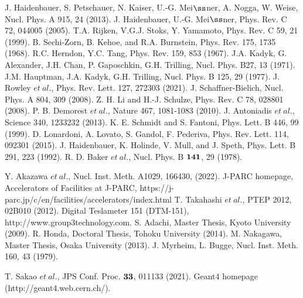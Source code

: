 \begin{thebibliography}{99}
J. Haidenbauer, S. Petschauer, N. Kaiser, U.-G. Mei$\ss$ner, A. Nogga, W. Weise, Nucl. Phys. A 915, 24 (2013).
J. Haidenbauer, U.-G. Mei$\ss$ner, Phys. Rev. C 72, 044005 (2005).
T.A. Rijken, V.G.J. Stoks, Y. Yamamoto, Phys. Rev. C 59, 21 (1999).
B. Sechi-Zorn, B. Kehoe, and R.A. Burnstein, Phys. Rev. 175, 1735 (1968).
R.C. Herndon, Y.C. Tang, Phys. Rev. 159, 853 (1967).
J.A. Kadyk, G. Alexander, J.H. Chan, P. Gaposchkin, G.H. Trilling, Nucl. Phys. B27, 13 (1971).
J.M. Hauptman, J.A. Kadyk, G.H. Trilling, Nucl. Phys. B 125, 29 (1977).
J. Rowley $et\ al.$, Phys. Rev. Lett. 127, 272303 (2021).
J. Schaffner-Bielich, Nucl. Phys. A 804, 309 (2008).
Z. H. Li and H.-J. Schulze, Phys. Rev. C 78, 028801 (2008).
P. B. Demorest $et\ al.$, Nature 467, 1081-1083 (2010).
J. Antoniadis $et\ al.$, Science 340, 1233232 (2013).
K. E. Schmidt and S. Fantoni, Phys. Lett. B 446, 99 (1999).
D. Lonardoni, A. Lovato, S. Gandol, F. Pederiva, Phys. Rev. Lett. 114, 092301 (2015).
J. Haidenbauer, K. Holinde, V. Mull, and J. Speth, Phys. Lett. B 291, 223 (1992).
R. D. Baker $et\ al.$, Nucl. Phys. B $\bf{141}$, 29 (1978).


Y. Akazawa $et\ al.$, Nucl. Inst. Meth. A1029, 166430, (2022).
J-PARC homepage, Accelerators of Facilities at J-PARC, https://j-parc.jp/c/en/facilities/accelerators/index.html
T. Takahashi $et\ al.$, PTEP 2012, 02B010 (2012).
Digital Teslameter 151 (DTM-151), http://www.group3technology.com.
S. Adachi, Master Thesis, Kyoto University (2009).
R. Honda, Doctoral Thesis, Tohoku University (2014).
M. Nakagawa, Master Thesis, Osaka University (2013).
J. Myrheim, L. Bugge, Nucl. Inst. Meth. 160, 43 (1979).

 T. Sakao $et\ al.$, JPS Conf. Proc. $\bf{33}$, 011133 (2021).
Geant4 homepage (http://geant4.web.cern.ch/).




\end{thebibliography}
